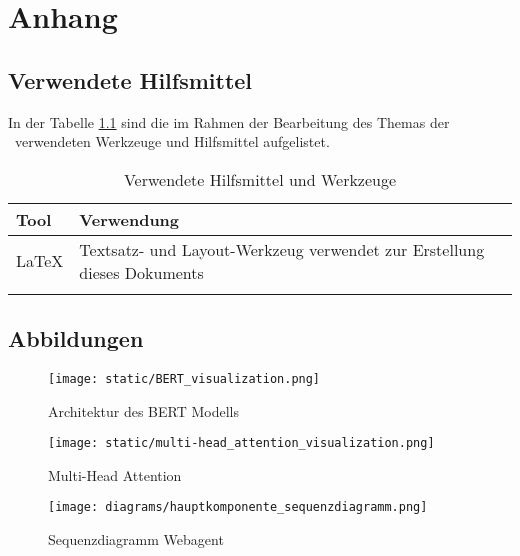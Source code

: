 \chapter{Anhang}

\section{Verwendete Hilfsmittel}
In der Tabelle \ref{tab:tooling} sind die im Rahmen der Bearbeitung des Themas der \IthesisKindDE~verwendeten Werkzeuge und Hilfsmittel aufgelistet.

\begin{table}[h!] %
\caption{Verwendete Hilfsmittel und Werkzeuge}
\begin{tabular}{|l|l|}
\hline 
\rowcolor{lightgray} Tool & Verwendung \\
\hline
\LaTeX & Textsatz- und Layout-Werkzeug verwendet zur Erstellung dieses Dokuments \\
\hline
 & \\
\hline
\end{tabular}
\label{tab:tooling}
\end{table}

\section{Abbildungen}

\begin{figure}[htbp]
    \begin{center}
        \texttt{[image: static/BERT\_visualization.png]}
        \caption{\label{fig:BERT_visualization} Architektur des BERT Modells \cite{peltarion2020bert}}
    \end{center}
\end{figure}

\begin{figure}[htbp]
    \begin{center}
        \texttt{[image: static/multi-head\_attention\_visualization.png]}
        \caption{\label{fig:multi_head_attention_visualization} Multi-Head Attention \cite{peltarion2020bert}}
    \end{center}
\end{figure}

\begin{figure}[htbp]
    \begin{center}
        \texttt{[image: diagrams/hauptkomponente\_sequenzdiagramm.png]}
        \caption{\label{fig:seq_hauptkomponente} Sequenzdiagramm Webagent}
    \end{center}
\end{figure}


